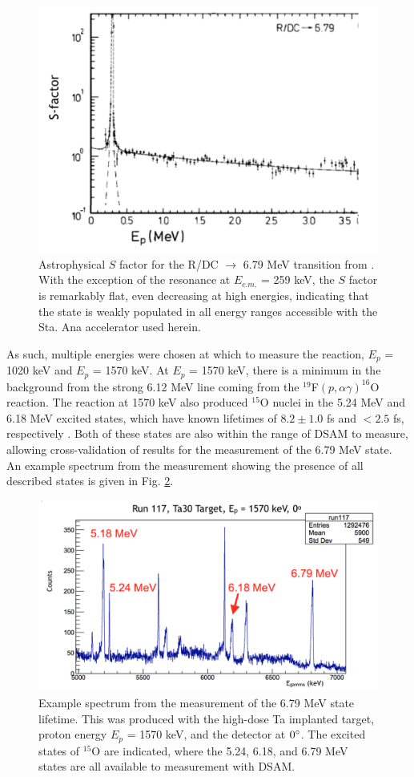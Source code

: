 \begin{figure}
\centering
\includegraphics[width=0.7\linewidth]{figures/schroderSfac.png}
\caption{Astrophysical $S$ factor for the R/DC $\rightarrow$ 6.79 MeV transition from \cite{Schroder1987}. With the exception of the resonance at $E_{c.m.}$ = 259 keV, the $S$ factor is remarkably flat, even decreasing at high energies, indicating that the state is weakly populated in all energy ranges accessible with the Sta. Ana accelerator used herein. }
\label{fig: schroderSfac}
\end{figure}


As such, multiple energies were chosen at which to measure the reaction, $E_{p}$ = 1020 keV and $E_{p}$ = 1570 keV. At $E_{p}$ = 1570 keV, there is a minimum in the background from the strong 6.12 MeV line coming from the $^{19}$F$\left( p, \alpha\gamma \right)^{16}$O reaction. The reaction at 1570 keV also produced $^{15}$O nuclei in the 5.24 MeV and 6.18 MeV excited states, which have known lifetimes of $8.2 \pm 1.0$ fs and $< 2.5$ fs, respectively \cite{Ajzenberg-Selove1991}. Both of these states are also within the range of DSAM to measure, allowing cross-validation of results for the measurement of the 6.79 MeV state. An example spectrum from the measurement showing the presence of all described states is given in Fig. \ref{fig: lifetimeSpec}.


\begin{figure}
\includegraphics[width=\linewidth]{figures/lifetimeSpectrum.png}
\caption{Example spectrum from the measurement of the 6.79 MeV state lifetime. This was produced with the high-dose Ta implanted target, proton energy $E_{p}$ = 1570 keV, and the detector at $0\degree$. The excited states of $^{15}$O are indicated, where the 5.24, 6.18, and 6.79 MeV states are all available to measurement with DSAM.  }
\label{fig: lifetimeSpec}
\end{figure}


